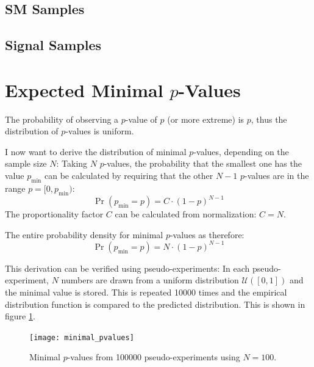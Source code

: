 \pagebreak
{
    \begin{landscape}    
        \subsection{\acl{SM} Samples}
        {
            \scriptsize
            \def\arraystretch{1}
            \centering
            
        }
        \newpage
        \subsection{Signal Samples}     
        {
            \scriptsize
            \def\arraystretch{1}
            \centering
            
        }
    \end{landscape}
}

\newpage
\section{Expected Minimal $p$-Values}
\label{app:minimal_pvalues}

The probability of observing a $p$-value of $p$ (or more extreme) is $p$, thus the distribution of $p$-values is uniform.

I now want to derive the distribution of minimal $p$-values, depending on the sample size $N$: 
Taking $N$ $p$-values, the probability that the smallest one has the value $p_\text{min}$ can be calculated by requiring that the other $N-1$ $p$-values are in the range $p=[0, p_\text{min})$:
\begin{equation}
    \Pr(p_\text{min} = p) = C \cdot \left(1-p\right)^{N-1}
\end{equation}
The proportionality factor $C$ can be calculated from normalization: $C = N$.

The entire probability density for minimal $p$-values as therefore:
\begin{equation}
    \Pr(p_\text{min} = p) = N \cdot \left(1-p\right)^{N-1}
\end{equation}

This derivation can be verified using pseudo-experiments: In each pseudo-experiment, $N$ numbers are drawn from a uniform distribution $\mathcal{U}([0, 1])$ and the minimal value is stored. This is repeated \num{10000} times and the empirical distribution function is compared to the predicted distribution. This is shown in figure \ref{fig:minimal_pvalues}.
\begin{figure}
    \centering
    \texttt{[image: minimal\_pvalues]}
    \caption{Minimal $p$-values from \num{100000} pseudo-experiments using $N = \num{100}$.}
    \label{fig:minimal_pvalues}
\end{figure}

